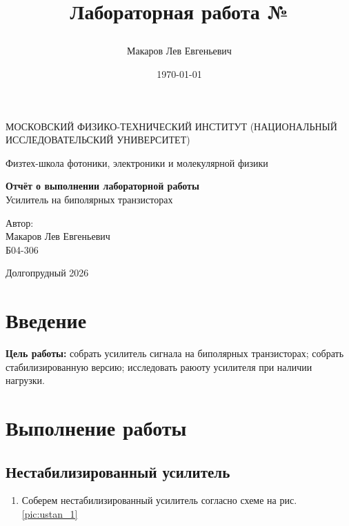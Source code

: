 \documentclass[a4paper,12pt]{article}
\author{Макаров Лев Евгеньевич}
\title{Лабораторная работа №\labnumber

\labname
}
\date{\today}
\newcommand\labname{Усилитель на биполярных транзисторах}
\newcommand\labnumber{}
\begin{document}
\begin{titlepage}
	\begin{center}
		{\large МОСКОВСКИЙ ФИЗИКО-ТЕХНИЧЕСКИЙ ИНСТИТУТ (НАЦИОНАЛЬНЫЙ ИССЛЕДОВАТЕЛЬСКИЙ УНИВЕРСИТЕТ)}
	\end{center}
	\begin{center}
		{\large Физтех-школа фотоники, электроники и молекулярной физики}
	\end{center}
	
	
	\vspace{4.5cm}
	{\huge
		\begin{center}
			{\bf Отчёт о выполнении лабораторной работы \labnumber}\\
			\labname
		\end{center}
	}
	\vspace{2cm}
	\begin{flushright}
		{\LARGE Автор:\\ Макаров Лев Евгеньевич \\
			\vspace{0.2cm}
			Б04-306}
	\end{flushright}
	\vspace{8cm}
	\begin{center}
		Долгопрудный 2026
	\end{center}
\end{titlepage}

\section{Введение}


\textbf{Цель работы:} собрать усилитель сигнала на биполярных транзисторах; собрать стабилизированную версию; исследовать раюоту усилителя при наличии нагрузки.

\section{Выполнение работы}

\subsection*{Нестабилизированный усилитель}

\begin{enumerate}
    \item Соберем нестабилизированный усилитель согласно схеме на рис. \ref{pic:ustan_1}
\end{enumerate}
\end{document}
